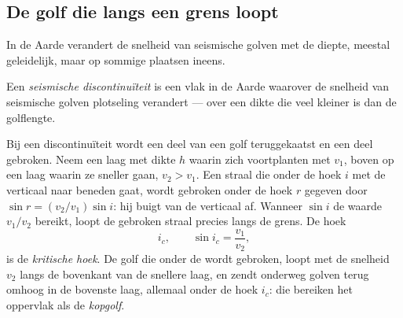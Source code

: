 \subsection{De golf die langs een grens loopt}

In de Aarde verandert de snelheid van seismische golven met de diepte, meestal
geleidelijk, maar op sommige plaatsen ineens.

\begin{definition}\label{def:g11:seismic-structure:discontinuity}
Een \emph{seismische discontinuïteit} is een vlak
in de Aarde waarover de snelheid van seismische golven plotseling verandert ---
over een dikte die veel kleiner is dan de golflengte.
\end{definition}

Bij een discontinuïteit wordt een deel van een golf teruggekaatst en een deel
gebroken. Neem een laag met dikte $h$ waarin  zich voortplanten met $v_1$,
boven op een laag waarin ze sneller gaan, $v_2 > v_1$. Een straal die onder de hoek
$i$ met de verticaal naar beneden gaat, wordt gebroken onder de hoek $r$ gegeven
door $\sin r = (v_2/v_1)\sin
i$: hij buigt van de verticaal af. Wanneer $\sin i$ de waarde $v_1/v_2$ bereikt,
loopt de gebroken straal precies langs de grens. De hoek
\[
  i_c, \qquad \sin i_c = \frac{v_1}{v_2},
\]
is de \emph{kritische hoek}. De golf die onder de  wordt gebroken, loopt met de snelheid $v_2$ langs de bovenkant van de snellere
laag, en zendt onderweg golven terug omhoog in de bovenste laag, allemaal onder de
hoek $i_c$: die bereiken het oppervlak als de \emph{kopgolf}.

